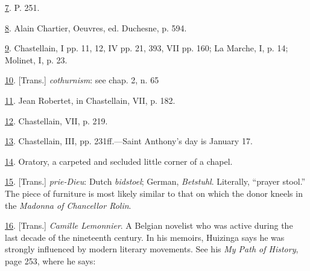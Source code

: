 \protect\hypertarget{23_NOTES.xhtmlux5cux23id_296}{\protect\hyperlink{21_Chapter_Thirteen__IMAGE_AND_WORD.xhtmlux5cux23id_295}{7}}.
P. 251.

\protect\hypertarget{23_NOTES.xhtmlux5cux23id_294}{\protect\hyperlink{21_Chapter_Thirteen__IMAGE_AND_WORD.xhtmlux5cux23id_293}{8}}.
Alain Chartier, Oeuvres, ed. Duchesne, p. 594.

\protect\hypertarget{23_NOTES.xhtmlux5cux23id_292}{\protect\hyperlink{21_Chapter_Thirteen__IMAGE_AND_WORD.xhtmlux5cux23id_291}{9}}.
Chastellain, I pp. 11, 12, IV pp. 21, 393, VII pp. 160; La Marche, I, p.
14; Molinet, I, p. 23.

\protect\hypertarget{23_NOTES.xhtmlux5cux23id_290}{\protect\hyperlink{21_Chapter_Thirteen__IMAGE_AND_WORD.xhtmlux5cux23id_289}{10}}.
{[}Trans.{]} \emph{cothurnism}: see chap. 2, n. 65

\protect\hypertarget{23_NOTES.xhtmlux5cux23id_288}{\protect\hyperlink{21_Chapter_Thirteen__IMAGE_AND_WORD.xhtmlux5cux23id_287}{11}}.
Jean Robertet, in Chastellain, VII, p. 182.

\protect\hypertarget{23_NOTES.xhtmlux5cux23id_286}{\protect\hyperlink{21_Chapter_Thirteen__IMAGE_AND_WORD.xhtmlux5cux23id_285}{12}}.
Chastellain, VII, p. 219.

\protect\hypertarget{23_NOTES.xhtmlux5cux23id_284}{\protect\hyperlink{21_Chapter_Thirteen__IMAGE_AND_WORD.xhtmlux5cux23id_283}{13}}.
Chastellain, III, pp. 231ff.---Saint Anthony's day is January 17.

\protect\hypertarget{23_NOTES.xhtmlux5cux23id_282}{\protect\hyperlink{21_Chapter_Thirteen__IMAGE_AND_WORD.xhtmlux5cux23id_281}{14}}.
Oratory, a carpeted and secluded little corner of a chapel.

\protect\hypertarget{23_NOTES.xhtmlux5cux23id_280}{\protect\hyperlink{21_Chapter_Thirteen__IMAGE_AND_WORD.xhtmlux5cux23id_279}{15}}.
{[}Trans.{]} \emph{prie-Dieu}: Dutch \emph{bidstoel}; German,
\emph{Betstuhl}. Literally, ``prayer stool.'' The piece of furniture is
most likely similar to that on which the donor kneels in the
\emph{Madonna of Chancellor Rolin}.

\protect\hypertarget{23_NOTES.xhtmlux5cux23id_278}{\protect\hyperlink{21_Chapter_Thirteen__IMAGE_AND_WORD.xhtmlux5cux23id_277}{16}}.
{[}Trans.{]} \emph{Camille Lemonnier}. A Belgian novelist who was active
during the last decade of the nineteenth century. In his memoirs,
Huizinga says he was strongly influenced by modern literary movements.
See his \emph{My Path of History}, page 253, where he says:

